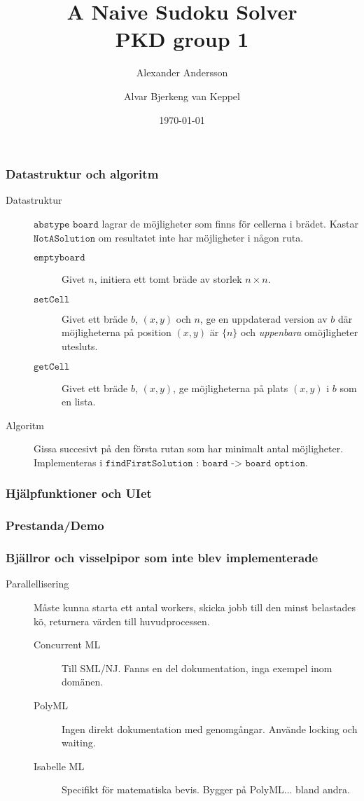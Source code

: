 \documentclass{beamer}
\title{A Naive Sudoku Solver\\\small{PKD group 1}}
\author{Alexander Andersson \and Alvar Bjerkeng van Keppel}
\date{\today}
\begin{document}
\begin{frame}[introslide]
  \titlepage
\end{frame}

\begin{frame}
  \frametitle{Datastruktur och algoritm}
\begin{description}
\item[Datastruktur] $\texttt{abstype board}$ lagrar de möjligheter som finns för cellerna i brädet. Kastar $\texttt{NotASolution}$ om resultatet inte har m\"ojligheter i n\aa gon ruta.
  \begin{description}
  \item[$\texttt{emptyboard}$] Givet $n$,
    initiera ett tomt bräde av storlek $n\times n$.
  \item[$\texttt{setCell}$] Givet ett bräde $b$, $(x,y)$ och $n$,
  ge en uppdaterad version av $b$ där möjligheterna på
  position $(x,y)$ är $\{n\}$ och \emph{uppenbara} omöjligheter utesluts.
\item[$\texttt{getCell}$] Givet ett bräde $b$, $(x,y)$,
  ge möjligheterna på plats $(x,y)$ i $b$ som en lista.
  \end{description}
\item[Algoritm] Gissa succesivt på den första rutan som har minimalt
  antal möjligheter. Implementeras i $\texttt{findFirstSolution : board -> board option}$.
\end{description}
\end{frame}

\begin{frame}
  \frametitle{Hjälpfunktioner och UIet}

\end{frame}

\begin{frame}
  \frametitle{Prestanda/Demo}
\end{frame}

\begin{frame}[t]
  \frametitle{Bjällror och visselpipor som inte blev implementerade}
\begin{description}
\item[Parallellisering] Måste kunna starta ett antal workers, skicka jobb till den minst belastades kö, returnera värden till huvudprocessen.
  \pause
  \begin{description}
  \item[Concurrent ML] Till SML/NJ. Fanns en del dokumentation, inga exempel inom domänen.
    \pause
  \item[PolyML] Ingen direkt dokumentation med genomgångar. Använde locking och waiting.
    \pause
  \item[Isabelle ML] Specifikt för matematiska bevis. Bygger på PolyML... bland andra.
  \end{description}
\end{description}
\end{frame}
\end{document}
